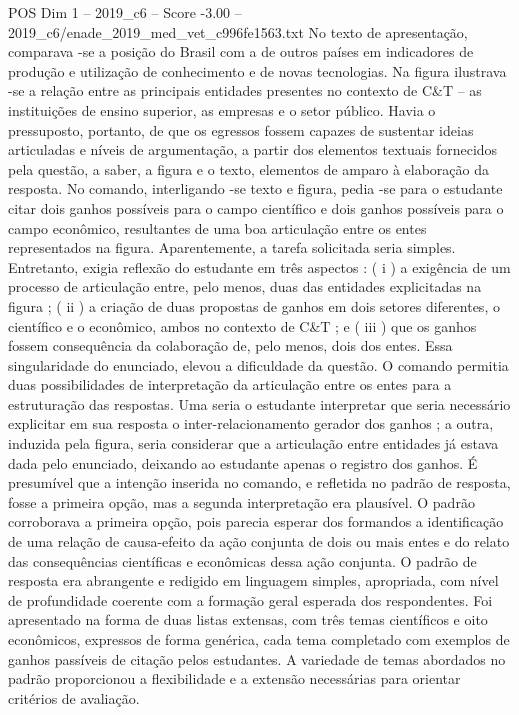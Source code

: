 \begin{textsample}{POS Dim 1 – 2019\_c6 – Score -3.00 – 2019\_c6/enade\_2019\_med\_vet\_c996fe1563.txt}
No texto de apresentação, comparava -se a posição do Brasil com a de outros países em indicadores de produção e utilização de conhecimento e de novas tecnologias.
Na figura ilustrava -se a relação entre as principais entidades presentes no contexto de C\&T – as instituições de ensino superior, as empresas e o setor público.
Havia o pressuposto, portanto, de que os egressos fossem capazes de sustentar ideias articuladas e níveis de argumentação, a partir dos elementos textuais fornecidos pela questão, a saber, a figura e o texto, elementos de amparo à elaboração da resposta.
No comando, interligando -se texto e figura, pedia -se para o estudante citar dois ganhos possíveis para o campo científico e dois ganhos possíveis para o campo econômico, resultantes de uma boa articulação entre os entes representados na figura.
Aparentemente, a tarefa solicitada seria simples.
Entretanto, exigia reflexão do estudante em três aspectos : ( i ) a exigência de um processo de articulação entre, pelo menos, duas das entidades explicitadas na figura ; ( ii ) a criação de duas propostas de ganhos em dois setores diferentes, o científico e o econômico, ambos no contexto de C\&T ; e ( iii ) que os ganhos fossem consequência da colaboração de, pelo menos, dois dos entes.
Essa singularidade do enunciado, elevou a dificuldade da questão.
O comando permitia duas possibilidades de interpretação da articulação entre os entes para a estruturação das respostas.
Uma seria o estudante interpretar que seria necessário explicitar em sua resposta o inter-relacionamento gerador dos ganhos ; a outra, induzida pela figura, seria considerar que a articulação entre entidades já estava dada pelo enunciado, deixando ao estudante apenas o registro dos ganhos.
É presumível que a intenção inserida no comando, e refletida no padrão de resposta, fosse a primeira opção, mas a segunda interpretação era plausível.
O padrão corroborava a primeira opção, pois parecia esperar dos formandos a identificação de uma relação de causa-efeito da ação conjunta de dois ou mais entes e do relato das consequências científicas e econômicas dessa ação conjunta.
O padrão de resposta era abrangente e redigido em linguagem simples, apropriada, com nível de profundidade coerente com a formação geral esperada dos respondentes.
Foi apresentado na forma de duas listas extensas, com três temas científicos e oito econômicos, expressos de forma genérica, cada tema completado com exemplos de ganhos passíveis de citação pelos estudantes.
A variedade de temas abordados no padrão proporcionou a flexibilidade e a extensão necessárias para orientar critérios de avaliação.

\end{textsample}
